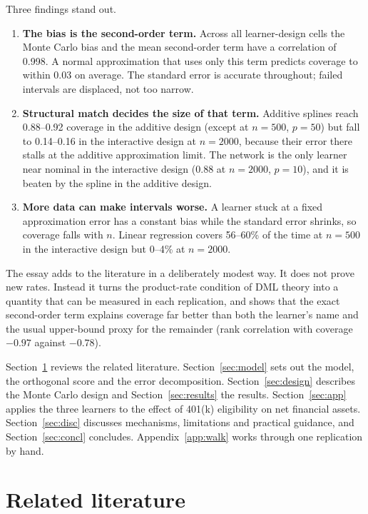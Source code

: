 \documentclass[11pt,a4paper]{article}
\begin{document}
Three findings stand out.
\begin{enumerate}
\item \textbf{The bias is the second-order term.} Across all learner-design cells the Monte Carlo bias and the mean second-order term have a correlation of 0.998. A normal approximation that uses only this term predicts coverage to within 0.03 on average. The standard error is accurate throughout; failed intervals are displaced, not too narrow.
\item \textbf{Structural match decides the size of that term.} Additive splines reach 0.88--0.92 coverage in the additive design (except at $n=500$, $p=50$) but fall to 0.14--0.16 in the interactive design at $n=2000$, because their error there stalls at the additive approximation limit. The network is the only learner near nominal in the interactive design (0.88 at $n=2000$, $p=10$), and it is beaten by the spline in the additive design.
\item \textbf{More data can make intervals worse.} A learner stuck at a fixed approximation error has a constant bias while the standard error shrinks, so coverage falls with $n$. Linear regression covers 56--60\% of the time at $n=500$ in the interactive design but 0--4\% at $n=2000$.
\end{enumerate}

The essay adds to the literature in a deliberately modest way. It does not prove new rates. Instead it turns the product-rate condition of DML theory into a quantity that can be measured in each replication, and shows that the exact second-order term explains coverage far better than both the learner's name and the usual upper-bound proxy for the remainder (rank correlation with coverage $-0.97$ against $-0.78$).

Section~\ref{sec:lit} reviews the related literature. Section~\ref{sec:model} sets out the model, the orthogonal score and the error decomposition. Section~\ref{sec:design} describes the Monte Carlo design and Section~\ref{sec:results} the results. Section~\ref{sec:app} applies the three learners to the effect of 401(k) eligibility on net financial assets. Section~\ref{sec:disc} discusses mechanisms, limitations and practical guidance, and Section~\ref{sec:concl} concludes. Appendix~\ref{app:walk} works through one replication by hand.

\section{Related literature}\label{sec:lit}
\end{document}
